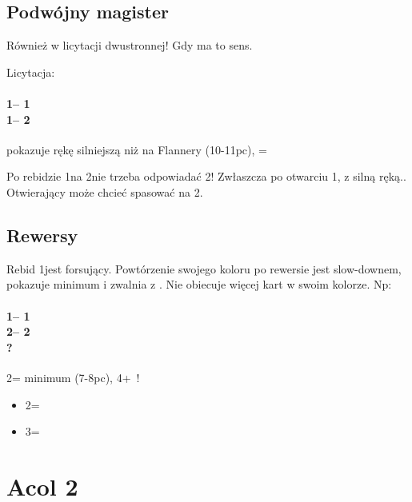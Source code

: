 \documentclass[12pt, a4paper]{report}
\begin{document}
{{        \section*{\colorbox{blue!30}{Podwójny magister}}
         {  
            Również w licytacji dwustronnej! Gdy ma to sens.

            Licytacja:
            \vspace{-0.3cm}
            \subsubsection*{1\clubs -- 1\spades\\
                            1\nt -- 2\hearts}
            pokazuje rękę silniejszą niż na Flannery (10-11pc), \nt = \lsf

            \vspace{0.4cm}
            Po rebidzie 1\spades na 2\clubs nie trzeba odpowiadać 2\diams!
            Zwłaszcza po otwarciu 1\diams, z silną ręką.. Otwierający może
            chcieć spasować na 2\diams.
        }

        \section*{\colorbox{blue!30}{Rewersy}}
         {
            Rebid 1\spades jest forsujący.
            Powtórzenie swojego koloru po rewersie jest slow-downem,
            pokazuje minimum i zwalnia z \gf. Nie obiecuje więcej kart w
            swoim kolorze. Np:
            \subsubsection*{1\clubs -- 1\spades\\
                            2\diams -- 2\spades\\
                            ?}
            2\spades = minimum (7-8pc), 4+\spades\ !
            \begin{itemize}
                \item 2\nt = \gf
                \item 3\minor = \nf
            \end{itemize}

        }
    }

    \chapter*{\colorbox{Plum!30}{Acol 2\clubs}}
     {
}}
\end{document}
